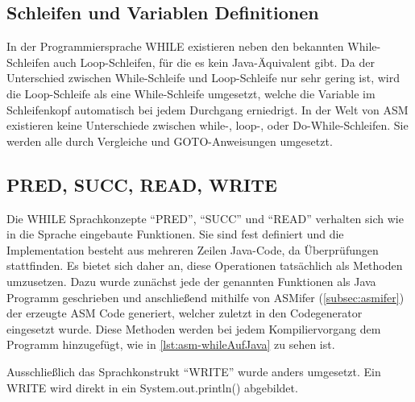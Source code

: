 \subsection{Schleifen und Variablen Definitionen}
In der Programmiersprache WHILE existieren neben den bekannten While-Schleifen auch Loop-Schleifen, für die es kein Java-Äquivalent gibt. Da der Unterschied zwischen While-Schleife und Loop-Schleife nur sehr gering ist, wird die Loop-Schleife als eine While-Schleife umgesetzt, welche die Variable im Schleifenkopf automatisch bei jedem Durchgang erniedrigt. In der Welt von ASM existieren keine Unterschiede zwischen while-, loop-, oder Do-While-Schleifen. Sie werden alle durch Vergleiche und GOTO-Anweisungen umgesetzt.

\subsection{PRED, SUCC, READ, WRITE}
Die WHILE Sprachkonzepte \enquote{PRED}, \enquote{SUCC} und \enquote{READ} verhalten sich wie in die Sprache eingebaute Funktionen. Sie sind fest definiert und die Implementation besteht aus mehreren Zeilen Java-Code, da Überprüfungen stattfinden. Es bietet sich daher an, diese Operationen tatsächlich als Methoden umzusetzen. Dazu wurde zunächst jede der genannten Funktionen als Java Programm geschrieben und anschließend mithilfe von ASMifer (\cref{subsec:asmifer}) der erzeugte ASM Code generiert, welcher zuletzt in den Codegenerator eingesetzt wurde. Diese Methoden werden bei jedem Kompiliervorgang dem Programm hinzugefügt, wie in \cref{lst:asm-whileAufJava} zu sehen ist.

Ausschließlich das Sprachkonstrukt \enquote{WRITE} wurde anders umgesetzt. Ein WRITE wird direkt in ein System.out.println() abgebildet.